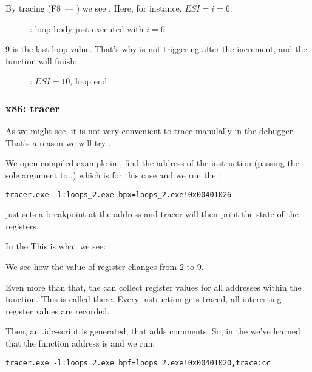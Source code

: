 By tracing (F8~--- \stepover) we see \ESI 
{}.
Here, for instance, $ESI=i=6$:

\begin{figure}[H]
\centering
{}
\caption{\olly: loop body just executed with $i=6$}
\label{fig:loops_olly_2}
\end{figure}

9 is the last loop value.
That's why \JL is not triggering after the \gls{increment}, and the function will finish:

\begin{figure}[H]
\centering
{}
\caption{\olly: $ESI=10$, loop end}
\label{fig:loops_olly_3}
\end{figure}

\subsubsection{x86: tracer}

As we might see, it is not very convenient to trace manulally in the debugger.
That's a reason we will try \tracer.

We open compiled example in \IDA, find the address of the instruction 
(passing the sole argument to \ttf,) which is  for this case and we run the \tracer:

\begin{lstlisting}
tracer.exe -l:loops_2.exe bpx=loops_2.exe!0x00401026
\end{lstlisting}

 just sets a breakpoint at the address and tracer will then print the state of the registers.

In the  This is what we see:



We see how the value of \ESI register changes from 2 to 9.

Even more than that, the \tracer can collect register values for all addresses within the function.
This is called  there.
Every instruction gets traced, all interesting register values are recorded.

Then, an \IDA .idc-script is generated, that adds comments.
So, in the \IDA we've learned that the \main function address is  and we run:

\begin{lstlisting}
tracer.exe -l:loops_2.exe bpf=loops_2.exe!0x00401020,trace:cc
\end{lstlisting}

